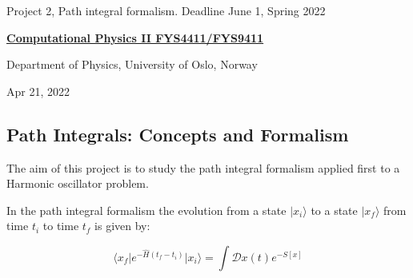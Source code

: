 \documentclass[%
oneside,                 %
final,                   %
10pt]{article}
\begin{document}

\newcommand{\exercisesection}[1]{\subsection*{#1}}






\thispagestyle{empty}

\begin{center}
{\LARGE\bf
\begin{spacing}{1.25}
Project 2, Path integral formalism. Deadline June 1, Spring 2022
\end{spacing}
}
\end{center}


\begin{center}
{\bf \href{{http://www.uio.no/studier/emner/matnat/fys/FYS4411/index-eng.html}}{Computational Physics II FYS4411/FYS9411}}
\end{center}

    \begin{center}
\centerline{{\small Department of Physics, University of Oslo, Norway}}
\end{center}
    

\begin{center}
Apr 21, 2022
\end{center}

\vspace{1cm}


\subsection*{Path Integrals: Concepts and Formalism}

The aim of this project is to study the path integral formalism applied first to a Harmonic oscillator problem.

In the path integral formalism the evolution from a state $\vert x_i\rangle$
to a state $\vert  x_f\rangle$ from time $t_i$ to time $t_f$ is given by:

\[
	\langle x_f\vert e^{-\hat{H}(t_f-t_i)}\vert x_i\rangle = \int \mathcal{D} x(t) e^{-S[x]}
\]
\end{document}
